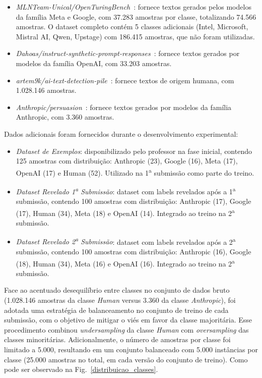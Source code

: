 \documentclass[runningheads]{llncs}
\begin{document}
\begin{itemize}
    \item \textit{MLNTeam-Unical/OpenTuringBench}~\cite{ds_openturingbench}: fornece textos gerados pelos modelos da família Meta e Google, com 37.283 amostras por classe, totalizando 74.566 amostras. O dataset completo contém 5 classes adicionais (Intel, Microsoft, Mistral AI, Qwen, Upstage) com 186.415 amostras, que não foram utilizadas.
    
    \item \textit{Dahoas/instruct-synthetic-prompt-responses}~\cite{ds_dahoas}: fornece textos gerados por modelos da família OpenAI, com 33.203 amostras.
    
    \item \textit{artem9k/ai-text-detection-pile}~\cite{ds_artem9k}: fornece textos de origem humana, com 1.028.146 amostras.
    
    \item \textit{Anthropic/persuasion}~\cite{ds_anthropic}: fornece textos gerados por modelos da família Anthropic, com 3.360 amostras.
\end{itemize}

Dados adicionais foram fornecidos durante o desenvolvimento experimental:

\begin{itemize}
    \item \textit{Dataset de Exemplos}: disponibilizado pelo professor na fase inicial, contendo 125 amostras com distribuição: Anthropic (23), Google (16), Meta (17), OpenAI (17) e Human (52). Utilizado na 1\textsuperscript{a} submissão como parte do treino.

    \item \textit{Dataset Revelado 1\textsuperscript{a} Submissão}: dataset com labels revelados após a 1\textsuperscript{a} submissão, contendo 100 amostras com distribuição: Anthropic (17), Google (17), Human (34), Meta (18) e OpenAI (14). Integrado ao treino na 2\textsuperscript{a} submissão.

    \item \textit{Dataset Revelado 2\textsuperscript{a} Submissão}: dataset com labels revelados após a 2\textsuperscript{a} submissão, contendo 100 amostras com distribuição: Anthropic (16), Google (18), Human (34), Meta (16) e OpenAI (16). Integrado ao treino na 2\textsuperscript{a} submissão.
\end{itemize}

Face ao acentuado desequilíbrio entre classes no conjunto de dados bruto (1.028.146 amostras da classe \emph{Human} versus 3.360 da classe \emph{Anthropic}), foi adotada uma estratégia de balanceamento no conjunto de treino de cada submissão, com o objetivo de mitigar o viés em favor da classe majoritária. Esse procedimento combinou \textit{undersampling} da classe \emph{Human} com \textit{oversampling} das classes minoritárias. Adicionalmente, o número de amostras por classe foi limitado a 5.000, resultando em um conjunto balanceado com 5.000 instâncias por classe (25.000 amostras no total, em cada versão do conjunto de treino). Como pode ser observado na Fig.~\ref{distribuicao_classes}.
\end{document}
